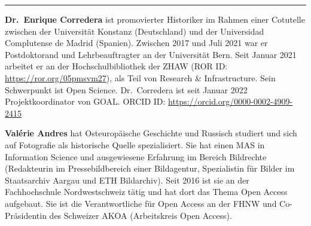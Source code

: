 \begin{center}\rule{0.5\linewidth}{0.5pt}\end{center}

\textbf{Dr.~Enrique Corredera} ist promovierter Historiker im Rahmen
einer Cotutelle zwischen der Universität Konstanz (Deutschland) und der
Universidad Complutense de Madrid (Spanien). Zwischen 2017 und Juli 2021
war er Postdoktorand und Lehrbeauftragter an der Universität Bern. Seit
Januar 2021 arbeitet er an der Hochschulbibliothek der ZHAW (ROR ID:
\url{https://ror.org/05pmsvm27}), als Teil von Research \&
Infrastructure. Sein Schwerpunkt ist Open Science. Dr.~Corredera ist
seit Januar 2022 Projektkoordinator von GOAL. ORCID ID:
\url{https://orcid.org/0000-0002-4909-2415}

\textbf{Valérie Andres} hat Osteuropäische Geschichte und Russisch
studiert und sich auf Fotografie als historische Quelle spezialisiert.
Sie hat einen MAS in Information Science und ausgewiesene Erfahrung im
Bereich Bildrechte (Redakteurin im Pressebildbereich einer Bildagentur,
Spezialistin für Bilder im Staatsarchiv Aargau und ETH Bildarchiv). Seit
2016 ist sie an der Fachhochschule Nordwestschweiz tätig und hat dort
das Thema Open Access aufgebaut. Sie ist die Verantwortliche für Open
Access an der FHNW und Co-Präsidentin des Schweizer AKOA (Arbeitskreis
Open Access).
